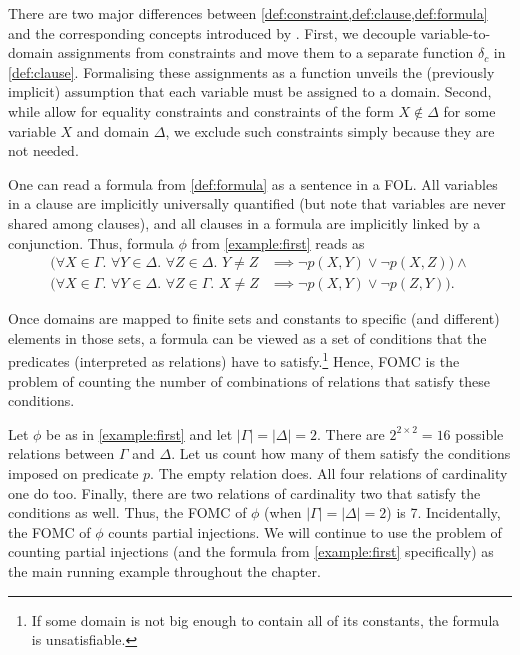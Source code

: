 There are two major differences between
\cref{def:constraint,def:clause,def:formula} and the corresponding concepts
introduced by \citet{DBLP:conf/ijcai/BroeckTMDR11}. First, we decouple
variable-to-domain assignments from constraints and move them to a separate
function $\delta_{c}$ in \cref{def:clause}. Formalising these assignments as a
function unveils the (previously implicit) assumption that each variable must be
assigned to a domain. Second, while \citet{DBLP:conf/ijcai/BroeckTMDR11} allow
for equality constraints and constraints of the form $X \not\in \Delta$ for some
variable $X$ and domain $\Delta$, we exclude such constraints simply because
they are not needed.

One can read a formula from \cref{def:formula} as a sentence in a FOL\@. All
variables in a clause are implicitly universally quantified (but note that
variables are never shared among clauses), and all clauses in a formula are
implicitly linked by a conjunction. Thus, formula $\phi$ from
\cref{example:first} reads as
\begin{align*}
  (\forall X \in \Gamma\text{. }\forall Y \in \Delta\text{. }\forall Z \in \Delta\text{. }Y \ne Z &\implies \neg p(X, Y) \lor \neg p(X, Z)) \land \\
  (\forall X \in \Gamma\text{. }\forall Y \in \Delta\text{. }\forall Z \in \Gamma\text{. }X \ne Z &\implies \neg p(X, Y) \lor \neg p(Z, Y)).
\end{align*}

Once domains are mapped to finite sets and constants to specific (and different)
elements in those sets, a formula can be viewed as a set of conditions that the
predicates (interpreted as relations) have to satisfy.\footnote{If some domain
  is not big enough to contain all of its constants, the formula is
  unsatisfiable.} Hence, FOMC is the problem of counting the number of
combinations of relations that satisfy these conditions.

\begin{example}
  Let $\phi$ be as in \cref{example:first} and let $|\Gamma| = |\Delta| = 2$.
  There are $2^{2 \times 2} = 16$ possible relations between $\Gamma$ and
  $\Delta$. Let us count how many of them satisfy the conditions imposed on
  predicate $p$. The empty relation does. All four relations of cardinality one
  do too. Finally, there are two relations of cardinality two that satisfy the
  conditions as well. Thus, the FOMC of $\phi$ (when $|\Gamma| = |\Delta| = 2$)
  is 7. Incidentally, the FOMC of $\phi$ counts partial injections. We will
  continue to use the problem of counting partial injections (and the formula
  from \cref{example:first} specifically) as the main running example throughout
  the chapter.
\end{example}

